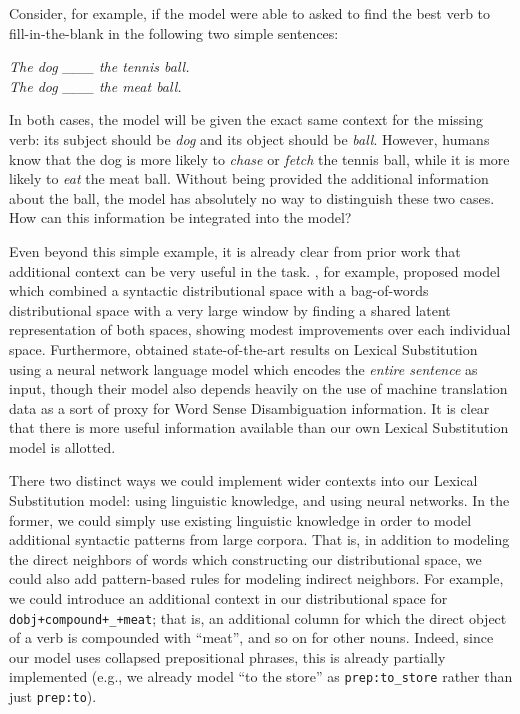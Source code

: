 \documentclass[12pt]{article}
\begin{document}
Consider, for example, if the model were able to asked to find the best verb
to fill-in-the-blank in the following two simple sentences:

\begin{center}
  {\em The dog \_\_\_ the tennis ball.}\\
  {\em The dog \_\_\_ the meat ball.}
\end{center}

In both cases, the model will be given the exact same context for the missing
verb: its subject should be {\em dog} and its object should be {\em ball}. However,
humans know that the dog is more likely to {\em chase} or {\em fetch} the tennis
ball, while it is more likely to {\em eat} the meat ball. Without being provided
the additional information about the ball, the model has absolutely no way
to distinguish these two cases. How can this information be integrated into the
model?

Even beyond this simple example, it is already clear from prior work that
additional context can be very useful in the task.
, for example, proposed model which combined
a syntactic distributional space with a bag-of-words distributional space with
a very large window by finding a shared latent representation of both spaces,
showing modest improvements over each individual space. Furthermore,
 obtained state-of-the-art results on Lexical
Substitution using a neural network language model which encodes the {\em
entire sentence} as input, though their model also depends heavily on the use
of machine translation data as a sort of proxy for Word Sense Disambiguation
information. It is clear that there is more useful information
available than our own Lexical Substitution model is allotted.

There two distinct ways we could implement wider contexts into our Lexical
Substitution model: using linguistic knowledge, and using neural networks.
In the former, we could simply use existing linguistic knowledge in order to
model additional syntactic patterns from large corpora. That is, in
addition to modeling the direct neighbors of words which constructing our
distributional space, we could also add pattern-based rules for modeling
indirect neighbors. For example, we could introduce an additional context
in our distributional space for {\tt dobj+compound+\_+meat}; that is, an
additional column for which the direct object of a verb is compounded with
``meat'', and so on for other nouns. Indeed, since our model uses collapsed
prepositional phrases, this is already partially implemented (e.g., we already
model ``to the store'' as {\tt prep:to\_store} rather than just {\tt prep:to}).
\end{document}
